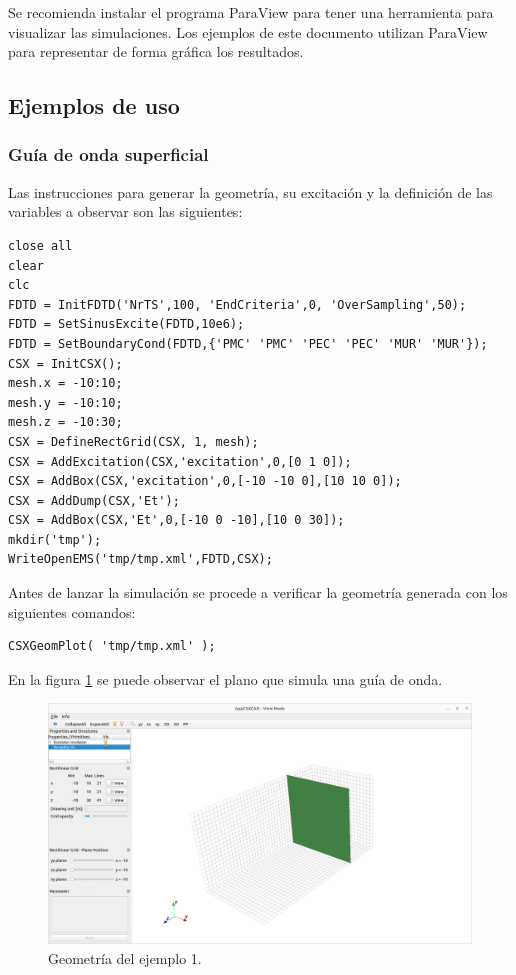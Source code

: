 \documentclass[
    11pt,
    spanish,
    a4paper
]{article}
\begin{document}
Se recomienda instalar el programa ParaView para tener una herramienta para
visualizar las simulaciones.
Los ejemplos de este documento utilizan ParaView para representar de forma
gráfica los resultados.

\subsection{Ejemplos de uso}
\label{sub:oejemplos}

\subsubsection{Guía de onda superficial}
\label{subsub:oejemplo1}

Las instrucciones para generar la geometría, su excitación y la definición de
las variables a observar son las siguientes:

\begin{verbatim}
close all
clear
clc
FDTD = InitFDTD('NrTS',100, 'EndCriteria',0, 'OverSampling',50);
FDTD = SetSinusExcite(FDTD,10e6);
FDTD = SetBoundaryCond(FDTD,{'PMC' 'PMC' 'PEC' 'PEC' 'MUR' 'MUR'});
CSX = InitCSX();
mesh.x = -10:10;
mesh.y = -10:10;
mesh.z = -10:30;
CSX = DefineRectGrid(CSX, 1, mesh);
CSX = AddExcitation(CSX,'excitation',0,[0 1 0]);
CSX = AddBox(CSX,'excitation',0,[-10 -10 0],[10 10 0]);
CSX = AddDump(CSX,'Et');
CSX = AddBox(CSX,'Et',0,[-10 0 -10],[10 0 30]);
mkdir('tmp');
WriteOpenEMS('tmp/tmp.xml',FDTD,CSX);
\end{verbatim}

Antes de lanzar la simulación se procede a verificar la geometría generada con
los siguientes comandos:

\begin{verbatim}
CSXGeomPlot( 'tmp/tmp.xml' );
\end{verbatim}

En la figura \ref{fig:geo1} se puede observar el plano que simula una guía de onda.

\begin{figure}[htbp]
	\centering
	\includegraphics[width=\textwidth]{./img/geo1.png}
	\caption{Geometría del ejemplo 1.}
	\label{fig:geo1}
\end{figure}
\end{document}

